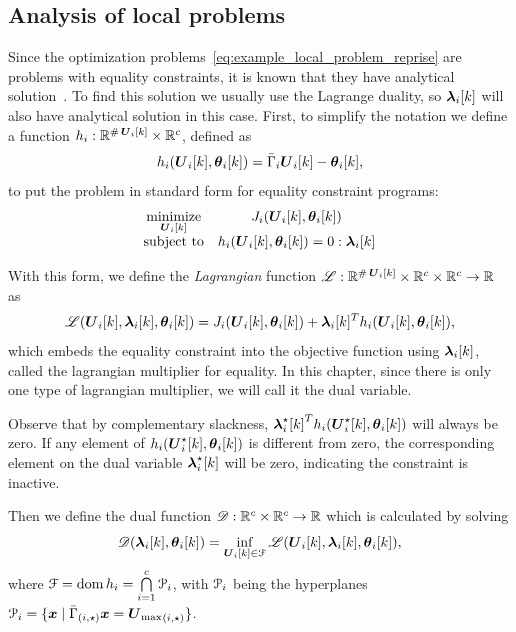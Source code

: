 \documentclass[../main.tex]{subfiles}
\begin{document}
\subsection{Analysis of local problems}\label{sec:analysis-local-problems}
Since the optimization problems~\eqref{eq:example_local_problem_reprise} are \qp{} problems with equality constraints, it is known that they have analytical solution~\cite{BoydVandenberghe2004}.
To find this solution we usually use the Lagrange duality, so $\lambdaik$ will also have analytical solution in this case.
First, to simplify the notation we define a function $\equalityfunctionname:\R^{\card\vec{U}_{i}[k]}\times \R^{c}$, defined as
\begin{equation}
  \label{eq:lagrangian_equality}
  \equalityfunction=\bar{\Gamma}_{i}\vec{U}_i[k]-\thetaik,
\end{equation}
to put the problem in standard form for equality constraint \qp{} programs:
\begin{equation}
  \begin{matrix}
  \label{eq:local_problem_equality_standard_notation}
    \minimize\limits_{\vec{U}_{i}[k]}&\obji(\vec{U}_{i}[k],\thetaik)\\
    \mathrm{subject~ to} & \equalityfunction= 0:\lambdaik
  \end{matrix}
\end{equation}

With this form, we define the \emph{Lagrangian} function $\lagrangianname : \R^{\card\vec{U}_{i}[k]}\times \R^{c} \times \R^{c} \to \R$ as
\begin{equation}
  \label{eq:lagrangian_equality}
  \lagrangian=\obji(\vec{U}_{i}[k],\thetaik)+\lambdaik^T\equalityfunction,
\end{equation}
which embeds the equality constraint into the objective function using $\lambdaik$, called the lagrangian multiplier for equality.
In this chapter, since there is only one type of lagrangian multiplier, we will call it the dual variable.
\begin{remark}
  Observe that by complementary slackness, ${\lambdaikstar}^T\equalityfunctionname(\vec{U}_{i}^{\star}[k],\thetaik)$ will always be zero.
 If any element of $\equalityfunctionname(\vec{U}_{i}^{\star}[k],\thetaik)$ is different from zero, the corresponding element on the dual variable $\lambdaikstar$ will be zero, indicating the constraint is inactive.
\end{remark}

Then we define the dual function $\dualfunctionname:\R^{c} \times \R^{c} \to \R$ which is calculated by solving
\begin{equation}
  \label{eq:dual_function_equality}
  \dualfunction=\inf_{\vec{U}_{i}[k]\in\set{F}} \lagrangian,
\end{equation}
where $\set{F}=\dom \equalityfunctionname=\bigcap\limits_{i=1}^{c}\set{P}_{i}$, with $\set{P}_{i}$ being the hyperplanes
${\set{P}_i=\setbuild{\vec{x}}{\elem[i,\star]{{\bar{\Gamma}}}\vec{x}=\elem[i,\star]{\vec{U}_{\max}}}}$.
\end{document}
